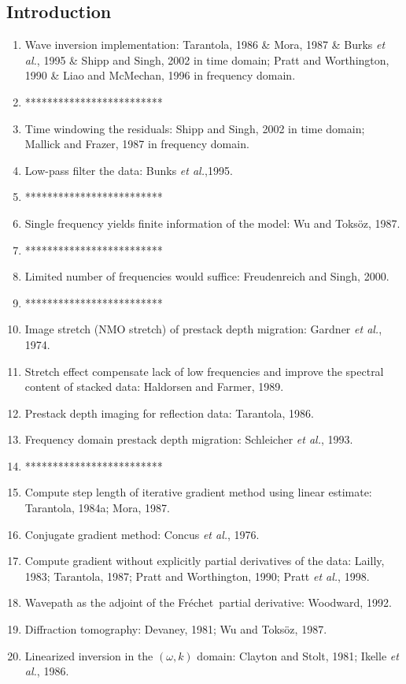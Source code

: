 \documentclass{article}
\newcommand{\sline}{*************************}
\newcommand{\Frechet}{Fr\'{e}chet~}
\newcommand{\etal}{\textit{et al.}}
\begin{document}
\subsection{Introduction}
\begin{enumerate}[\hspace{10mm}*]
  \item Wave inversion implementation: Tarantola, 1986 \& Mora, 1987 \& Burks \etal, 1995 \& Shipp and Singh, 2002 in time domain; Pratt and Worthington, 1990 \& Liao and McMechan, 1996 in frequency domain.
  \item \sline
  \item Time windowing the residuals: Shipp and Singh, 2002 in time domain; Mallick and Frazer, 1987 in frequency domain.
  \item Low-pass filter the data: Bunks \etal,1995.
  \item \sline
  \item Single frequency yields finite information of the model: Wu and Toks\"{o}z, 1987.
  \item \sline
  \item Limited number of frequencies would suffice: Freudenreich and Singh, 2000.
  \item \sline
  \item Image stretch (NMO stretch) of prestack depth migration: Gardner \etal, 1974.
  \item Stretch effect compensate lack of low frequencies and improve the spectral content of stacked data: Haldorsen and Farmer, 1989.
  \item Prestack depth imaging for reflection data: Tarantola, 1986.
  \item Frequency domain prestack depth migration: Schleicher \etal, 1993.
  \item \sline
  \item Compute step length of iterative gradient method using linear estimate: Tarantola, 1984a; Mora, 1987.
  \item Conjugate gradient method: Concus \etal, 1976.
  \item Compute gradient without explicitly partial derivatives of the data: Lailly, 1983; Tarantola, 1987; Pratt and Worthington, 1990; Pratt \etal, 1998.
  \item Wavepath as the adjoint of the \Frechet partial derivative: Woodward, 1992.
  \item Diffraction tomography: Devaney, 1981; Wu and Toks\"{o}z, 1987.
  \item Linearized inversion in the $(\omega,k)$ domain: Clayton and Stolt, 1981; Ikelle \etal, 1986.
\end{enumerate}\par
\end{document}
